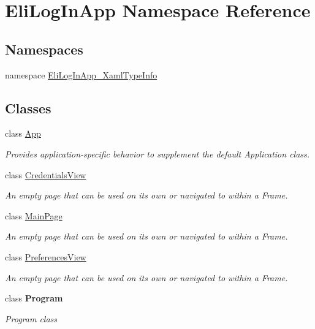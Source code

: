 \hypertarget{namespace_eli_log_in_app}{}\section{Eli\+Log\+In\+App Namespace Reference}
\label{namespace_eli_log_in_app}
\subsection*{Namespaces}
\begin{DoxyCompactItemize}
\item 
namespace \hyperlink{namespace_eli_log_in_app_1_1_eli_log_in_app___xaml_type_info}{Eli\+Log\+In\+App\+\_\+\+Xaml\+Type\+Info}
\end{DoxyCompactItemize}
\subsection*{Classes}
\begin{DoxyCompactItemize}
\item 
class \hyperlink{class_eli_log_in_app_1_1_app}{App}
\begin{DoxyCompactList}\small\item\em Provides application-\/specific behavior to supplement the default Application class. \end{DoxyCompactList}\item 
class \hyperlink{class_eli_log_in_app_1_1_credentials_view}{Credentials\+View}
\begin{DoxyCompactList}\small\item\em An empty page that can be used on its own or navigated to within a Frame. \end{DoxyCompactList}\item 
class \hyperlink{class_eli_log_in_app_1_1_main_page}{Main\+Page}
\begin{DoxyCompactList}\small\item\em An empty page that can be used on its own or navigated to within a Frame. \end{DoxyCompactList}\item 
class \hyperlink{class_eli_log_in_app_1_1_preferences_view}{Preferences\+View}
\begin{DoxyCompactList}\small\item\em An empty page that can be used on its own or navigated to within a Frame. \end{DoxyCompactList}\item 
class {\bfseries Program}
\begin{DoxyCompactList}\small\item\em Program class \end{DoxyCompactList}\end{DoxyCompactItemize}
